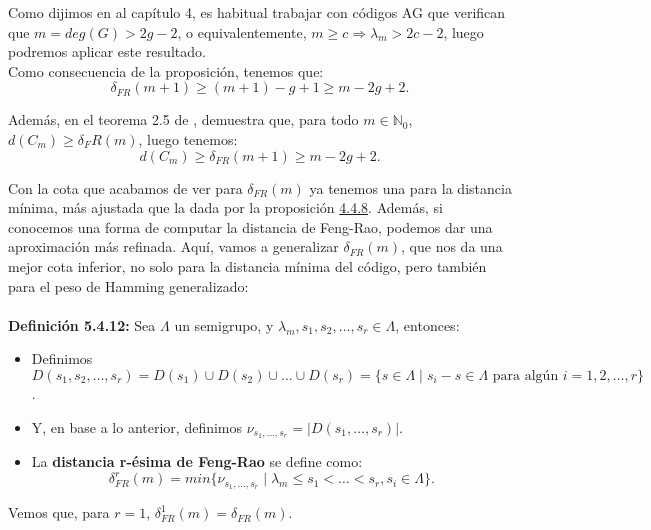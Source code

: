 \documentclass[11pt,spanish]{book}
\newcommand{\la}{\lambda}
\begin{document}
Como dijimos en al capítulo 4, es habitual trabajar con códigos AG que verifican que $m=deg(G)>2g-2$, o equivalentemente, $m\geq c\Rightarrow \la_m>2c-2$, luego podremos aplicar este resultado.\\

Como consecuencia de la proposición, tenemos que: 
$$\delta_{FR}(m+1)\geq (m+1)-g+1 \geq m-2g+2.$$ 

Además, en el teorema 2.5 de \cite{Kirfel}, demuestra que, para todo $m\in\mathbb{N}_0$, $d(C_m)\geq \delta_FR(m)$, luego tenemos:
$$d(C_m)\geq \delta_{FR}(m+1)\geq m-2g+2.$$

Con la cota que acabamos de ver para $\delta_{FR}(m)$ ya tenemos una para la distancia mínima, más ajustada que la dada por la proposición \hyperlink{prop4.4.8}{4.4.8}. Además, si conocemos una forma de computar la distancia de Feng-Rao, podemos dar una aproximación más refinada. Aquí, vamos a generalizar $\delta_{FR}(m)$, que nos da una mejor cota inferior, no solo para la distancia mínima del código, pero también para el peso de Hamming generalizado:\\
\\ \textbf{Definición 5.4.12:} Sea $\Lambda$ un semigrupo, y $\la_m,s_1, s_2,\ldots,s_r\in \Lambda$, entonces:
\begin{itemize}
    \item Definimos $D(s_1,s_2,\ldots,s_r)=D(s_1)\cup D(s_2)\cup \ldots \cup D(s_r) = \{s\in \Lambda \;|\; s_{i}-s\in \Lambda \text{ para algún } i=1,2,\ldots, r\}$. 
    \item Y, en base a lo anterior, definimos $\nu_{s_1,\ldots,s_r}=|D(s_1,\ldots,s_r)|$.
    \item La \textbf{distancia r-ésima de Feng-Rao} se define como: $$\delta_{FR}^{r}(m)=min\{\nu_{s_1,\ldots,s_r}\;|\; \la_m\leq s_1<\ldots<s_r,s_i\in \Lambda\}.$$
\end{itemize}

Vemos que, para $r=1$, $\delta_{FR}^{1}(m)=\delta_{FR}(m)$.\\
\end{document}
